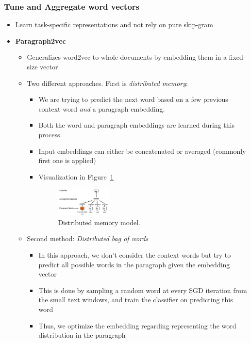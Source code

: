 \subsubsection{Tune and Aggregate word vectors}
\begin{itemize}
	\item Learn task-specific representations and not rely on pure skip-gram
	\item \textbf{Paragraph2vec}
	\begin{itemize}
		\item Generalizes word2vec to whole documents by embedding them in a fixed-size vector
		\item Two different approaches. First is \textit{distributed memory}:
		\begin{itemize}
			\item We are trying to predict the next word based on a few previous context word \textit{and} a paragraph embedding. 
			\item Both the word and paragraph embeddings are learned during this process
			\item Input embeddings can either be concatenated or averaged (commonly first one is applied)
			\item Visualization in Figure~\ref{img:neural_models_distributed_memory}
			\begin{figure}[ht]
				\centering
				\includegraphics[width=0.3\textwidth]{figures/neural_models_distributed_memory.png}
				\caption{Distributed memory model. }
				\label{img:neural_models_distributed_memory}
			\end{figure}
		\end{itemize}
		\item Second method: \textit{Distributed bag of words}
		\begin{itemize}
			\item In this approach, we don't consider the context words but try to predict all possible words in the paragraph given the embedding vector
			\item This is done by sampling a random word at every SGD iteration from the small text windows, and train the classifier on predicting this word
			\item Thus, we optimize the embedding regarding representing the word distribution in the paragraph

\end{itemize}
\end{itemize}
\end{itemize}
